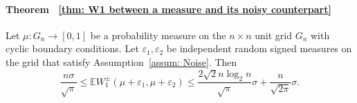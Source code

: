 \documentclass{article}
\theoremstyle{plain}
\theoremstyle{definition}
\theoremstyle{remark}
\begin{document}
\paragraph{Theorem ~\ref{thm: W1 between a measure and its noisy counterpart}}
Let $\mu : G_n \to [0,1]$ be a probability measure on the $n\times n$ unit grid $G_n$ with cyclic boundary conditions. Let $\varepsilon_1, \varepsilon_2$ be independent random signed measures on the grid that satisfy Assumption~\ref{assum: Noise}. Then
\begin{equation}
    \frac{n \sigma}{\sqrt{ \pi}}
    \le
    \mathbb{E} W^{\pm}_1(\mu+\varepsilon_1,\mu+\varepsilon_2)
    \le \frac{2\sqrt{2} n \log_2 n}{\sqrt{\pi}} \sigma  + \frac{n}{\sqrt{2\pi}} \sigma .
\end{equation}
\end{document}
